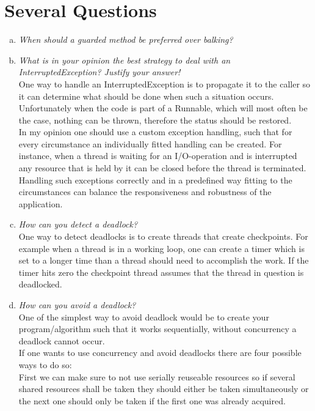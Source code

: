 \documentclass{report}
\author{Marcel \textsc{Zauder} 16-124-836 \\
	Pascal \textsc{Gerig} 16-104-721}
\begin{document}
	\section{Several Questions}
	\startsection
		\begin{enumerate}[a)]
			\item \textit{When should a guarded method be preferred over balking?} \\
			\item \textit{What is in your opinion the best strategy to deal with an InterruptedException? Justify your answer!} \\
			One way to handle an InterruptedException is to propagate it to the caller so it can determine what should be done when such a situation occurs. Unfortunately when the code is part of a Runnable, which will most often be the case, nothing can be thrown, therefore the status should be restored. \\
			In my opinion one should use a custom exception handling, such that for every circumstance an individually fitted handling can be created. For instance, when a thread is waiting for an I/O-operation and is interrupted any resource that is held by it can be closed before the thread is terminated. Handling such exceptions correctly and in a predefined way fitting to the circumstances can balance the responsiveness and robustness of the application.
			\item \textit{How can you detect a deadlock?} \\
			One way to detect deadlocks is to create threads that create checkpoints. For example when a thread is in a working loop, one can create a timer which is set to a longer time than a thread should need to accomplish the work. If the timer hits zero the checkpoint thread assumes that the thread in question is deadlocked.
			\item \textit{How can you avoid a deadlock?} \\
			One of the simplest way to avoid deadlock would be to create your program/algorithm such that it works sequentially, without concurrency a deadlock cannot occur. \\
			If one wants to use concurrency and avoid deadlocks there are four possible ways to do so: \\
			First we can make sure to not use serially reuseable resources so if several shared resources shall be taken they should either be taken simultaneously or the next one should only be taken if the first one was already acquired. \\

\end{enumerate}
\end{document}
